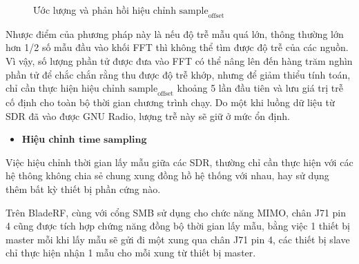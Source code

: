 {\begin{figure}[!h]
{}
\hfill
{}
\hfill
\caption{Ước lượng và phản hồi hiệu chỉnh $\textrm{sample}_\textrm{offset}$}
\label{fig:sample_offset}
\end{figure}

Nhược điểm của phương pháp này là nếu độ trễ mẫu quá lớn, thông thường lớn hơn 1/2 số mẫu đầu vào khối FFT thì không thể tìm được độ trễ của các nguồn. Vì vậy, số lượng phần tử được đưa vào FFT có thể nâng lên đến hàng trăm nghìn phần tử để chắc chắn rằng thu được độ trễ khớp, nhưng để giảm thiểu tính toán, chỉ cần thực hiện hiệu chỉnh $\textrm{sample}_\textrm{offset}$ khoảng 5 lần đầu tiên và lưu giá trị trễ cố định cho toàn bộ thời gian chương trình chạy. Do một khi luồng dữ liệu từ SDR đã vào được GNU Radio, lượng trễ này sẽ giữ ở mức ổn định.

\begin{itemize}
	\item \textbf{Hiệu chỉnh $\textbf{time sampling}$}
\end{itemize} 

Việc hiệu chỉnh thời gian lấy mẫu giữa các SDR, thường chỉ cần thực hiện với các hệ thông không chia sẻ chung xung đồng hồ hệ thống với nhau, hay sử dụng thêm bất kỳ thiết bị phần cứng nào.

Trên BladeRF, cùng với cổng SMB sử dụng cho chức năng MIMO, chân J71 pin 4 cũng được tích hợp chứng năng đồng bộ thời gian lấy mẫu, bằng việc 1 thiết bị master mỗi khi lấy mẫu sẽ gửi đi một xung qua chân J71 pin 4, các thiết bị slave chỉ thực hiện nhận 1 mẫu cho mỗi xung từ thiết bị master. 

}
